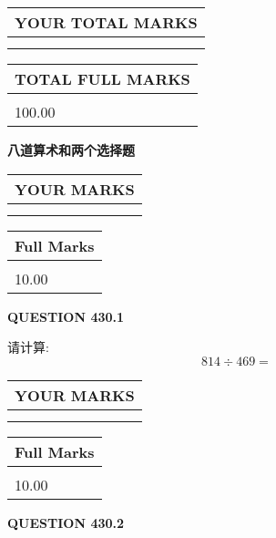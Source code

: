 \documentclass{ctexart}
\begin{document}
   
\vspace{0.2in}\noindent\begin{tabular}{|l|}
\hline
YOUR TOTAL MARKS  \\
\hline
 \\ 
 \\ 
\hline
\end{tabular}
\hspace{0.05in} \begin{tabular}{|l|}
\hline
TOTAL FULL MARKS  \\
\hline
 \\ 
100.00 \\
\hline
\end{tabular}
   
   
 \vspace{0.2in}
{\LARGE {\textbf{ 八道算术和两个选择题}}}
   
   
  
\vspace{0.2in}
  
\noindent\begin{tabular}{|l|}
\hline
 YOUR MARKS  \\
\hline
 \\ 
 \\ 
\hline
\end{tabular}
\hspace{0.05in} \begin{tabular}{|l|}
\hline
 Full Marks  \\
\hline
 \\ 
10.00 \\
\hline
\end{tabular}
{\textbf{\Large{QUESTION
430.1 
}}}
  
  
 
请计算:
\begin{equation}
814  \div    %
469 = \nonumber
\end{equation}
 

 

 
  
\vspace{0.2in}
  
\noindent\begin{tabular}{|l|}
\hline
 YOUR MARKS  \\
\hline
 \\ 
 \\ 
\hline
\end{tabular}
\hspace{0.05in} \begin{tabular}{|l|}
\hline
 Full Marks  \\
\hline
 \\ 
10.00 \\
\hline
\end{tabular}
{\textbf{\Large{QUESTION
430.2 
}}}
  
\end{document}
